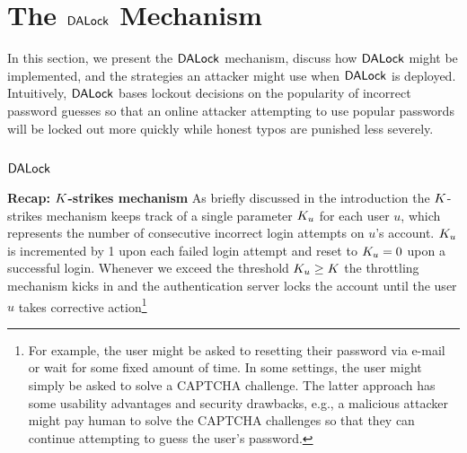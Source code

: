 
\vspace*{-\baselineskip}
\vspace*{-\baselineskip}
\section{The $\mathsf{DALock}$ Mechanism}\label{sec:DALockAlgorithm} %
\vspace*{-\baselineskip}
In this section, we present the $\mathsf{DALock}$ mechanism, discuss how $\mathsf{DALock}$ might be implemented, and the strategies an attacker might use when $\mathsf{DALock}$ is deployed. Intuitively, $\mathsf{DALock}$ bases lockout decisions on the popularity of incorrect password guesses so that an online attacker attempting to use popular passwords will be locked out more quickly while honest typos are punished less severely. 
%

\vspace*{-\baselineskip}
\vspace*{-\baselineskip}
\subsection{$\mathsf{DALock}$} %
\vspace*{-\baselineskip}


{\bf \noindent Recap: $K$-strikes mechanism} As briefly discussed in the introduction the $K$-strikes mechanism keeps track of a single parameter $K_u$ for each user $u$, which represents the number of consecutive incorrect login attempts on $u$’s account. $K_u$ is incremented by 1 upon each failed login attempt and reset to $K_u=0$ upon a successful {login}. Whenever we exceed the threshold  $K_u \geq K$  the throttling mechanism kicks in and the authentication server locks the account until the user $u$ takes corrective action\footnote{For example, the user might be asked to resetting their password via e-mail or wait for some fixed amount of time. In some settings, the user might simply be asked to solve a CAPTCHA challenge. The latter approach has some usability advantages and security drawbacks, e.g., a malicious attacker might pay human to solve the CAPTCHA challenges so that they can continue attempting to guess the user's password.}

